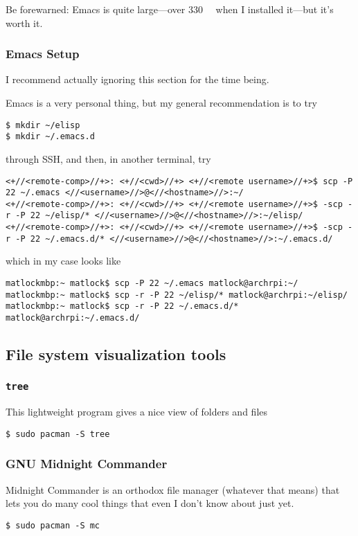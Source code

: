 \documentclass[12pt,letterpaper]{article}
\begin{document}
Be forewarned: Emacs is quite large---over \SI{330}{\mebi\byte} when I installed it---but it's worth it.

\subsubsection{Emacs Setup\label{emacs-setup}}
I recommend actually ignoring this section for the time being.

Emacs is a very personal thing, but my general recommendation is to try
\begin{lstlisting}
$ mkdir ~/elisp
$ mkdir ~/.emacs.d
\end{lstlisting}
through SSH, and then, in another terminal, try
\begin{lstlisting}[basicstyle=\ttfamily\footnotesize]
<+//<remote-comp>//+>: <+//<cwd>//+> <+//<remote username>//+>$ scp -P 22 ~/.emacs <//<username>//>@<//<hostname>//>:~/
<+//<remote-comp>//+>: <+//<cwd>//+> <+//<remote username>//+>$ -scp -r -P 22 ~/elisp/* <//<username>//>@<//<hostname>//>:~/elisp/
<+//<remote-comp>//+>: <+//<cwd>//+> <+//<remote username>//+>$ -scp -r -P 22 ~/.emacs.d/* <//<username>//>@<//<hostname>//>:~/.emacs.d/
\end{lstlisting}
which in my case looks like
\begin{lstlisting}[basicstyle=\ttfamily\footnotesize]
matlockmbp:~ matlock$ scp -P 22 ~/.emacs matlock@archrpi:~/
matlockmbp:~ matlock$ scp -r -P 22 ~/elisp/* matlock@archrpi:~/elisp/
matlockmbp:~ matlock$ scp -r -P 22 ~/.emacs.d/* matlock@archrpi:~/.emacs.d/
\end{lstlisting}

\subsection{File system visualization tools}

\subsubsection{\lstinline{tree}}
This lightweight  program gives a nice view of folders and files
\begin{lstlisting}
$ sudo pacman -S tree
\end{lstlisting}

\subsubsection{GNU Midnight Commander}
Midnight Commander is an orthodox file manager (whatever that means) that lets
you do many cool things that even I don't know about just yet.
\begin{lstlisting}
$ sudo pacman -S mc
\end{lstlisting}
\end{document}
